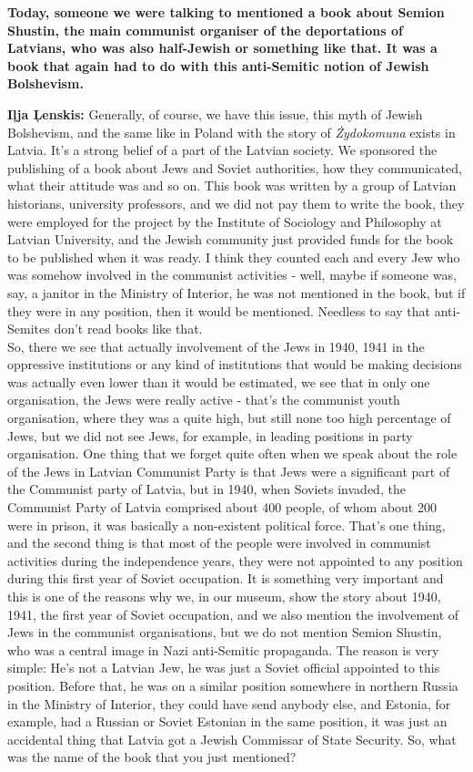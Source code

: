 \textbf{Today, someone we were talking to mentioned a book about Semion Shustin, the main communist organiser of the deportations of Latvians, who was also half-Jewish or something like that. It was a book that again had to do with this anti-Semitic notion of Jewish Bolshevism.} 

\textbf{Iļja Ļenskis:} Generally, of course, we have this issue, this myth of Jewish Bolshevism, and the same like in Poland with the story of \textit{Żydokomuna} exists in Latvia. It’s a strong belief of a part of the Latvian society. We sponsored the publishing of a book about Jews and Soviet authorities, how they communicated, what their attitude was and so on. This book was written by a group of Latvian historians, university professors, and we did not pay them to write the book, they were employed for the project by the Institute of Sociology and Philosophy at Latvian University, and the Jewish community just provided funds for the book to be published when it was ready. I think they counted each and every Jew who was somehow involved in the communist activities - well, maybe if someone was, say, a janitor in the Ministry of Interior, he was not mentioned in the book, but if they were in any position, then it would be mentioned. Needless to say that anti-Semites don’t read books like that.\\
So, there we see that actually involvement of the Jews in 1940, 1941 in the oppressive institutions or any kind of institutions that would be making decisions was actually even lower than it would be estimated, we see that in only one organisation, the Jews were really active - that’s the communist youth organisation, where they was a quite high, but still none too high percentage of Jews, but we did not see Jews, for example, in leading positions in party organisation. One thing that we forget quite often when we speak about the role of the Jews in Latvian Communist Party is that Jews were  a significant part of the Communist party of Latvia, but in 1940, when Soviets invaded, the Communist Party of Latvia comprised about 400 people, of whom about 200 were in prison, it was basically a non-existent political force. That’s one thing, and the second thing is that most of the people were involved in communist activities during the independence years, they were not appointed to any position during this first year of Soviet occupation. It is something very important and this is one of the reasons why we, in our museum, show the story about 1940, 1941, the first year of Soviet occupation, and we also mention the involvement of Jews in the communist organisations, but we do not mention Semion Shustin, who was a central image in Nazi anti-Semitic propaganda. The reason is very simple: He’s not a Latvian Jew, he was just a Soviet official appointed to this position. Before that, he was on a similar position somewhere in northern Russia in the Ministry of Interior, they could have send anybody else, and Estonia, for example, had a Russian or Soviet Estonian in the same position, it was just an accidental thing that Latvia got a Jewish Commissar of State Security. So, what was the name of the book that you just mentioned? 

